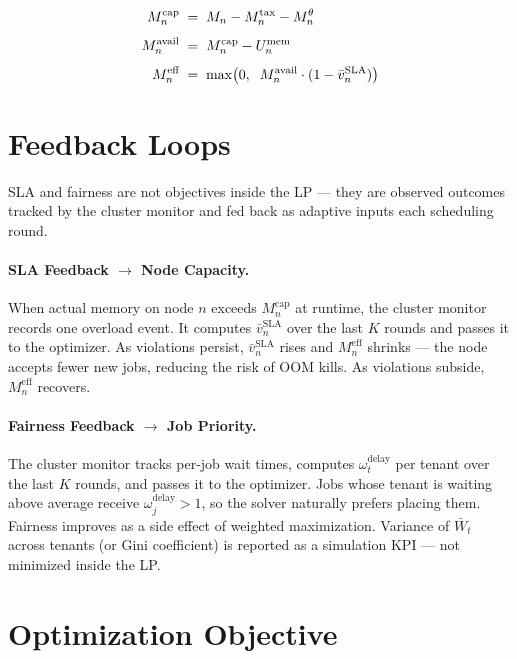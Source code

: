 \documentclass[11pt]{article}
\newcommand{\vbarsla}{\bar{v}_n^{\text{SLA}}}
\newcommand{\Meff}{M_n^{\text{eff}}}
\newcommand{\Mcap}{M_n^{\text{cap}}}
\newcommand{\Mavail}{M_n^{\text{avail}}}
\newcommand{\Mtax}{M_n^{\text{tax}}}
\newcommand{\Mtheta}{M_n^{\theta}}
\newcommand{\Umem}{U_n^{\text{mem}}}
\newcommand{\omdelay}{\omega_j^{\text{delay}}}
\newcommand{\omdelayt}{\omega_t^{\text{delay}}}
\begin{document}
\begin{align}
  \Mcap    &\;=\; M_n - \Mtax - \Mtheta \notag \\[4pt]
  \Mavail  &\;=\; \Mcap - \Umem \notag \\[4pt]
  \Meff    &\;=\; \max\!\left(0,\;\; \Mavail \cdot (1 - \vbarsla)\right) \notag
\end{align}

\section{Feedback Loops}

SLA and fairness are not objectives inside the LP --- they are observed
outcomes tracked by the cluster monitor and fed back as adaptive inputs each
scheduling round.

\paragraph{SLA Feedback $\rightarrow$ Node Capacity.}
When actual memory on node $n$ exceeds $\Mcap$ at runtime, the cluster
monitor records one overload event. It computes $\vbarsla$ over the last $K$
rounds and passes it to the optimizer. As violations persist, $\vbarsla$ rises
and $\Meff$ shrinks --- the node accepts fewer new jobs, reducing the risk of
OOM kills. As violations subside, $\Meff$ recovers.

\paragraph{Fairness Feedback $\rightarrow$ Job Priority.}
The cluster monitor tracks per-job wait times, computes $\omdelayt$ per tenant
over the last $K$ rounds, and passes it to the optimizer. Jobs whose tenant is
waiting above average receive $\omdelay > 1$, so the solver naturally prefers
placing them. Fairness improves as a side effect of weighted maximization.
Variance of $\bar{W}_t$ across tenants (or Gini coefficient) is reported as a
simulation KPI --- not minimized inside the LP.

\section{Optimization Objective}
\end{document}
